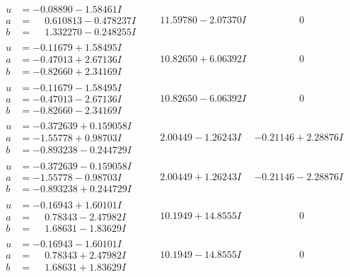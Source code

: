 \documentclass[1p]{elsarticle_modified}
\theoremstyle{definition}
\begin{document}
$$\begin{array}{c|c|c}
\begin{aligned}
u &= -0.08890 - 1.58461 I \\
a &= \phantom{-}0.610813 - 0.478237 I \\
b &= \phantom{-}1.332270 - 0.248255 I\end{aligned}
 & \phantom{-}11.59780 - 2.07370 I & \phantom{-0.000000 } 0 \\ \hline\begin{aligned}
u &= -0.11679 + 1.58495 I \\
a &= -0.47013 + 2.67136 I \\
b &= -0.82660 + 2.34169 I\end{aligned}
 & \phantom{-}10.82650 + 6.06392 I & \phantom{-0.000000 } 0 \\ \hline\begin{aligned}
u &= -0.11679 - 1.58495 I \\
a &= -0.47013 - 2.67136 I \\
b &= -0.82660 - 2.34169 I\end{aligned}
 & \phantom{-}10.82650 - 6.06392 I & \phantom{-0.000000 } 0 \\ \hline\begin{aligned}
u &= -0.372639 + 0.159058 I \\
a &= -1.55778 + 0.98703 I \\
b &= -0.893238 - 0.244729 I\end{aligned}
 & \phantom{-}2.00449 - 1.26243 I & -0.21146 + 2.28876 I \\ \hline\begin{aligned}
u &= -0.372639 - 0.159058 I \\
a &= -1.55778 - 0.98703 I \\
b &= -0.893238 + 0.244729 I\end{aligned}
 & \phantom{-}2.00449 + 1.26243 I & -0.21146 - 2.28876 I \\ \hline\begin{aligned}
u &= -0.16943 + 1.60101 I \\
a &= \phantom{-}0.78343 - 2.47982 I \\
b &= \phantom{-}1.68631 - 1.83629 I\end{aligned}
 & \phantom{-}10.1949 + 14.8555 I & \phantom{-0.000000 } 0 \\ \hline\begin{aligned}
u &= -0.16943 - 1.60101 I \\
a &= \phantom{-}0.78343 + 2.47982 I \\
b &= \phantom{-}1.68631 + 1.83629 I\end{aligned}
 & \phantom{-}10.1949 - 14.8555 I & \phantom{-0.000000 } 0\\

\end{array}$$
\end{document}
